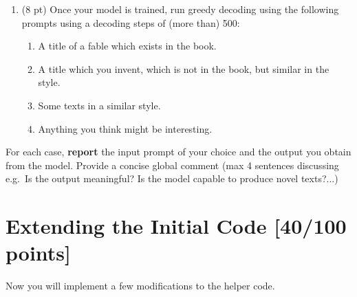 \documentclass[a4paper,11pt]{article}
\begin{document}
\begin{enumerate}
\item (8 pt) Once your model is trained, run greedy decoding using the following prompts using a decoding steps of (more than) 500:
\begin{enumerate}
\item A title of a fable which exists in the book.
\item A title which you invent, which is not in the book, but similar in the style.
\item Some texts in a similar style.
\item Anything you think might be interesting.
\end{enumerate}
\end{enumerate}
For each case, \textbf{report} the input prompt of your choice and the output you obtain from the model. Provide a concise global comment (max 4 sentences discussing e.g.~Is the output meaningful? Is the model capable to produce novel texts?...)

\section{Extending the Initial Code [40/100 points]}
\label{sec:3}
Now you will implement a few modifications to the helper code. 
\end{document}
